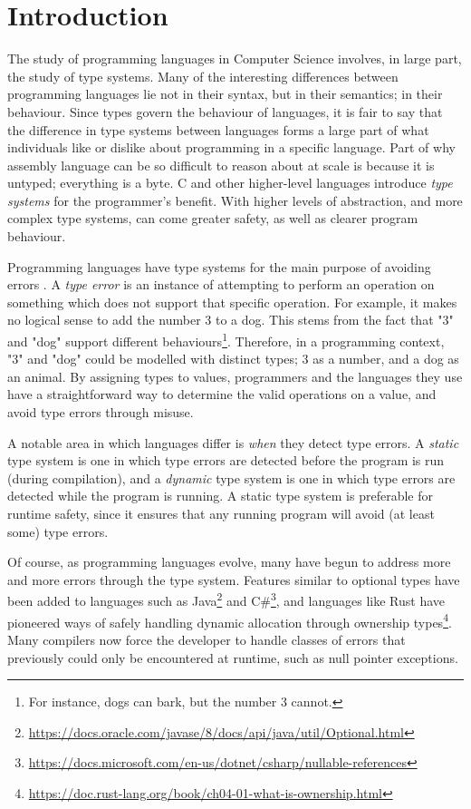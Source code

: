 \chapter{Introduction}

The study of programming languages in Computer Science involves, in large part, the study of type systems. Many of the interesting differences between programming languages lie not in their syntax, but in their semantics; in their behaviour. Since types govern the behaviour of languages, it is fair to say that the difference in type systems between languages forms a large part of what individuals like or dislike about programming in a specific language. Part of why assembly language can be so difficult to reason about at scale is because it is untyped; everything is a byte. C and other higher-level languages introduce \emph{type systems} for the programmer's benefit. With higher levels of abstraction, and more complex type systems, can come greater safety, as well as clearer program behaviour.

Programming languages have type systems for the main purpose of avoiding errors \cite{cardellitypes}. A \emph{type error} is an instance of attempting to perform an operation on something which does not support that specific operation. For example, it makes no logical sense to add the number 3 to a dog. This stems from the fact that "3" and "dog" support different behaviours\footnote{For instance, dogs can bark, but the number 3 cannot.}. Therefore, in a programming context, "3" and "dog" could be modelled with distinct types; 3 as a number, and a dog as an animal. By assigning types to values, programmers and the languages they use have a straightforward way to determine the valid operations on a value, and avoid type errors through misuse.

A notable area in which languages differ is \emph{when} they detect type errors. A \emph{static} type system is one in which type errors are detected before the program is run (during compilation), and a \emph{dynamic} type system is one in which type errors are detected while the program is running. A static type system is preferable for runtime safety, since it ensures that any running program will avoid (at least some) type errors.

Of course, as programming languages evolve, many have begun to address more and more errors through the type system. Features similar to optional types have been added to languages such as Java\footnote{\url{https://docs.oracle.com/javase/8/docs/api/java/util/Optional.html}} and C\#\footnote{\url{https://docs.microsoft.com/en-us/dotnet/csharp/nullable-references}}, and languages like Rust have pioneered ways of safely handling dynamic allocation through ownership types\footnote{\url{https://doc.rust-lang.org/book/ch04-01-what-is-ownership.html}}. Many compilers now force the developer to handle classes of errors that previously could only be encountered at runtime, such as null pointer exceptions.

